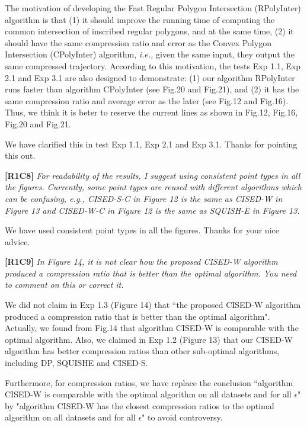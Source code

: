 \documentclass{letter}
\newcommand{\ie}{\emph{i.e.,}\xspace}
\begin{document}
{The motivation of developing the Fast Regular Polygon Intersection (RPolyInter) algorithm is that (1) it should improve the running time of computing the common intersection of inscribed regular polygons, and at the same time, (2) it should have the same compression ratio and error as the Convex Polygon Intersection (CPolyInter) algorithm, \ie  given the same input, they output the same compressed trajectory.
%
According to this motivation, the tests Exp 1.1, Exp 2.1 and Exp 3.1 are also designed to demonstrate: (1) our algorithm RPolyInter runs faster than algorithm CPolyInter (see Fig.20 and Fig.21), and (2) it has the same compression ratio and average error as the later (see Fig.12 and Fig.16).
%
Thus, we think it is beter to reserve the current lines as shown in Fig.12, Fig.16, Fig.20 and Fig.21. %

We have clarified this in test Exp 1.1, Exp 2.1 and Exp 3.1. Thanks for pointing this out.

\textbf{[R1C8]} \emph{For readability of the results, I suggest using consistent point types in all the figures. Currently, some point types are reused with different algorithms which can be confusing, e.g., CISED-S-C in Figure 12 is the same as CISED-W in Figure 13 and CISED-W-C in Figure 12 is the same as SQUISH-E in Figure 13.}

We have used consistent point types in all the figures. Thanks for your nice advice.

\textbf{[R1C9]} \emph{In Figure 14, it is not clear how the proposed CISED-W algorithm produced a compression ratio that is better than the optimal algorithm. You need to comment on this or correct it.}

We did not claim in Exp 1.3 (Figure 14) that ``the proposed CISED-W algorithm produced a compression ratio that is better than the optimal algorithm".
Actually, we found from Fig.14 that algorithm CISED-W is comparable with the optimal algorithm.
Also, we claimed in Exp 1.2 (Figure 13) that our CISED-W algorithm has better compression ratios than other sub-optimal algorithms, including DP, SQUISHE and CISED-S.

Furthermore, for compression ratios, we have replace the conclusion ``algorithm CISED-W is comparable with the optimal algorithm on all datasets and for all $\epsilon$" by "algorithm CISED-W has the closest compression ratios to the optimal algorithm on all datasets and for all $\epsilon$" to avoid controversy.

}
\end{document}
